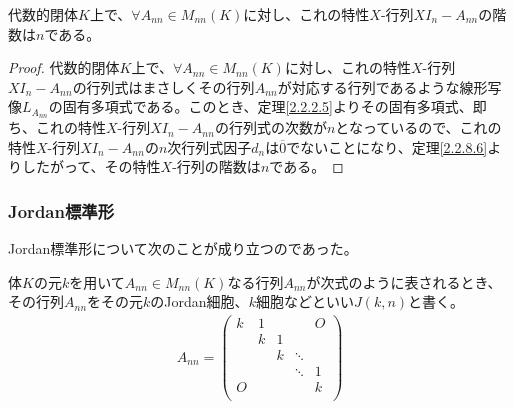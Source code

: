 \documentclass[dvipdfmx]{jsarticle}
\begin{document}
\begin{thm}\label{2.2.8.12}
代数的閉体$K$上で、$\forall A_{nn} \in M_{nn}(K)$に対し、これの特性$X$-行列$XI_{n} - A_{nn}$の階数は$n$である。
\end{thm}
\begin{proof}
代数的閉体$K$上で、$\forall A_{nn} \in M_{nn}(K)$に対し、これの特性$X$-行列$XI_{n} - A_{nn}$の行列式はまさしくその行列$A_{nn}$が対応する行列であるような線形写像$L_{A_{nn}}$の固有多項式である。このとき、定理\ref{2.2.2.5}よりその固有多項式、即ち、これの特性$X$-行列$XI_{n} - A_{nn}$の行列式の次数が$n$となっているので、これの特性$X$-行列$XI_{n} - A_{nn}$の$n$次行列式因子$d_{n}$は$\overline{0}$でないことになり、定理\ref{2.2.8.6}よりしたがって、その特性$X$-行列の階数は$n$である。
\end{proof}
\subsubsection{Jordan標準形}%
Jordan標準形について次のことが成り立つのであった。
\begin{dfn*}
体$K$の元$k$を用いて$A_{nn} \in M_{nn}(K)$なる行列$A_{nn}$が次式のように表されるとき、その行列$A_{nn}$をその元$k$のJordan細胞、$k$細胞などといい$J(k,n)$と書く。
\begin{align*}
A_{nn} = \begin{pmatrix}
k & 1 & \  & \  & O \\
\  & k & 1 & \  & \  \\
\  & \  & k & \ddots & \  \\
\  & \  & \  & \ddots & 1 \\
O & \  & \  & \  & k \\
\end{pmatrix}
\end{align*}
\end{dfn*}
\end{document}
